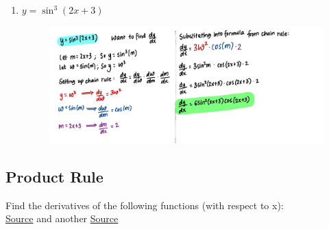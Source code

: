\documentclass{article}
\begin{document}
\begin{enumerate}
\begin{figure}[H]
        \label{fig:Q5}
    \end{figure}
    \item $y = \sin^3\left(2x+3\right)$
    \begin{figure}[H]
        \centering
        \includegraphics[width= \linewidth]{Q6.jpg}
        \label{fig:Q6}
    \end{figure}
\end{enumerate}

\subsection*{Product Rule}
Find the derivatives of the following functions (with respect to x):\\
\noindent \href{https://people.math.harvard.edu/~knill/teaching/math1a2021/handouts/lecture09.pdf}{Source} and another \href{https://math.arizona.edu/~calc/m124/Prod&Quot.pdf}{Source}
\end{document}
